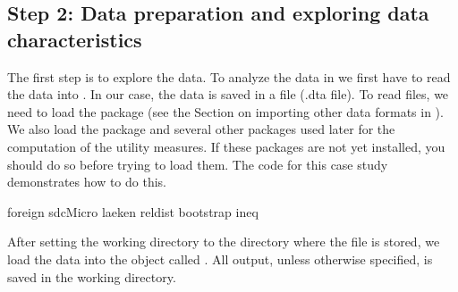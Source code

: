 \documentclass[letterpaper,10pt,english]{sphinxmanual}
\begin{document}
\subsection{Step 2: Data preparation and exploring data characteristics}
\label{\detokenize{case_studies:step-2-data-preparation-and-exploring-data-characteristics}}
The first step is to explore the data. To analyze the data in  we
first have to read the data into . In our case, the data is saved in
a  file (.dta file). To read  files, we need to load the 
package  (see the Section
on importing other data formats in
). We also load the  package and several other packages
used later for the computation of the utility measures. If these
packages are not yet installed, you should do so before trying to load
them. The  code for this case study demonstrates how to do this.

\def\sphinxLiteralBlockLabel{\label{\detokenize{case_studies:code91}}}
%
\begin{sphinxVerbatim}[commandchars=\\\{\},numbers=left,firstnumber=1,stepnumber=1]
foreign   
sdcMicro  
laeken    
reldist   
bootstrap 
ineq      
\end{sphinxVerbatim}

After setting the working directory to the directory where the 
file is stored, we load the data into the object called . All
output, unless otherwise specified, is saved in the working directory.
\end{document}

